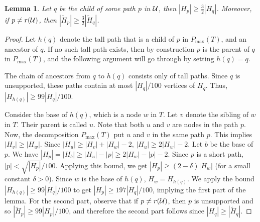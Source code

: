 \documentclass[11pt]{article}
\newtheorem{lemma}[theorem]{Lemma}
\theoremstyle{definition}
\newcommand{\cU}{{\cal U}}
\newcommand{\Obs}[1]{\hyperref[obs:#1]{Observation~\ref*{obs:#1}}} %
\newcommand{\pmax}{P_{\max}}
\newcommand{\redH}{\widetilde{H}}
\begin{document}
\begin{lemma}
\label{lem:geometric}
 Let $q$ be the child of some path $p$ in $\cU$, then $|H_p|\geq \frac{3}{2}|H_q|$. 
 Moreover, if $p\neq r(\cU)$, then $|\redH_p|\geq \frac{3}{2}|\redH_q|$. 
\end{lemma}
\begin{proof} Let $h(q)$ denote the tall path that is a child of $p$ in $\pmax(T)$,
and an ancestor of $q$. If no such tall path exists, then by construction $p$ is the parent 
of $q$ in $\pmax(T)$, and the following argument will go through by setting $h(q)=q$.

The chain of ancestors from $q$ to $h(q)$ consists only of tall paths.
Since $q$ is unsupported, these paths contain at most $|H_q|/100$ vertices of $H_q$. 
Thus, $|H_{h(q)}| \geq 99|H_q|/100$.

Consider the base
of $h(q)$, which is a node $w$ in $T$. Let $v$ denote the sibling of $w$ in $T$.
Their parent is called $u$. Note that both $u$ and $v$ are nodes in the path $p$.
Now, the decomposition $\pmax(T)$ put $u$ and $v$ in the same path $p$. This
implies $|H_v| \geq |H_w|$. Since $|H_u| \geq |H_v| + |H_w| - 2$,
$|H_u| \geq 2|H_w| - 2$. Let $b$ be the base of $p$.
We have $|H_p| = |H_b| \geq |H_u| - |p| \geq 2|H_w| - |p| - 2$. Since $p$ is a short path, $|p| < \sqrt{|H_p|}/100$.
Applying this bound, we get $|H_p| \geq (2-\delta)|H_w|$ (for a small constant $\delta > 0$).
Since $w$ is the base of $h(q)$, $H_w = H_{h(q)}$. We apply the bound $|H_{h(q)}| \geq 99|H_q|/100$
to get $|H_p| \geq 197|H_q|/100$, implying the first part of the lemma.  For the second part, observe that 
if $p\neq r(\cU)$, then $p$ is unsupported and so $|\redH_p| \geq 99|H_p|/100$, and therefore the second part follows since $|H_q| \geq |\redH_q|$.
%
%
\end{proof}
\end{document}
